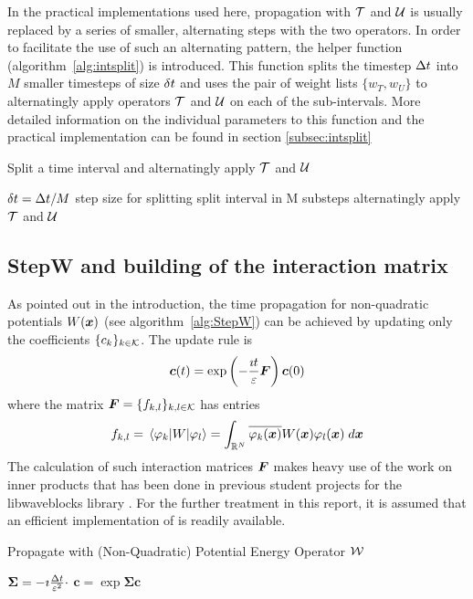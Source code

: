 %
In the practical implementations used here, propagation with $\mathcal{T}$ and $\mathcal{U}$ is usually replaced by a series of smaller, alternating steps with the two operators.
In order to facilitate the use of such an alternating pattern, the helper function  (algorithm~\ref{alg:intsplit}) is introduced.
This function splits the timestep $\Delta t$ into $M$ smaller timesteps of size $\delta t$ and uses the pair of weight lists $\{ w_T, w_U \}$ to alternatingly apply operators $\mathcal{T}$ and $\mathcal{U}$ on each of the sub-intervals.
More detailed information on the individual parameters to this function and the practical implementation can be found in section \ref{subsec:intsplit}
%
\begin{algorithm}[h]
	\caption{Split a time interval and alternatingly apply $\mathcal{T}$ and $\mathcal{U}$}
	\label{alg:intsplit}
	\begin{algorithmic}
		\State
			\State
			\State $\delta t = \Delta t/M$
			\Comment step size for splitting
			\Comment split interval in M substeps
				\Comment alternatingly apply $\mathcal{T}$ and $\mathcal{U}$
					\State {}
					\State {}
				\EndFor
			\EndFor
		\State
		\EndProcedure
	\end{algorithmic}
\end{algorithm}


\subsection{StepW and building of the interaction matrix}
%
As pointed out in the introduction, the time propagation for non-quadratic potentials $W(\bm{x})$ (see algorithm~\ref{alg:StepW}) can be achieved by updating only the coefficients $\{ c_k \}_{k \in \mathcal{K}}$.
The update rule is
%
\begin{align}
	\bm{c}(t) = \exp \left( - \frac{\imath t}{\varepsilon} \bm{F} \right) \bm{c}(0)
\end{align}
%
where the matrix $\bm{F} = \{ f_{k,l} \}_{k,l \in \mathcal{K}}$ has entries
%
\begin{align}
	f_{k,l} = \matrixel{\varphi_k}{W}{\varphi_l}
	= \int_{\R^N} \conj{\varphi_k(\bvec{x})} W(\bvec{x}) \varphi_l(\bvec{x}) \; \dif \bvec{x}
\end{align}
%
The calculation of such interaction matrices $\bm{F}$ makes heavy use of the work on inner products that has been done in previous student projects for the libwaveblocks library \cite{libwaveblocks}.
For the further treatment in this report, it is assumed that an efficient implementation of  is readily available.
%
\begin{algorithm}[h]
	\caption{Propagate with (Non-Quadratic) Potential Energy Operator $\mathcal{W}$}
	\label{alg:StepW}
	\begin{algorithmic}
		\State
		\Procedure{StepW}{$\upic,\Dt$}
			\State $\bm{\Sigma} = - \imath \frac{\Delta t}{\varepsilon^2} \cdot$ \Call{BuildF}{$\Pi$}
			\State $\bm{c} = \exp{\bm{\Sigma}} \bm{c}$
		\EndProcedure
		\State
	\end{algorithmic}
\end{algorithm}
